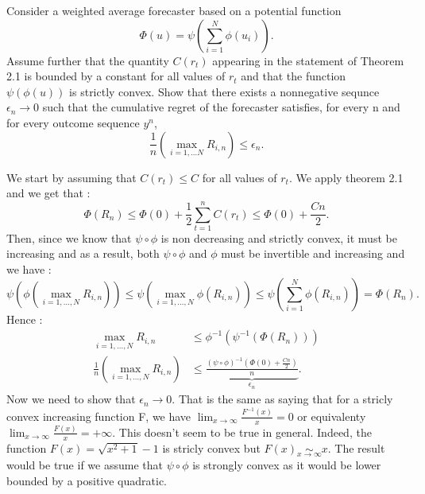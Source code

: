 \begin{exercise}[]{}
	Consider a weighted average forecaster based on a potential function
\begin{equation*}
	\Phi(u) = \psi \left( \sum_{i=1}^{N} \phi(u_i) \right).
\end{equation*}
Assume further that the quantity $ C(r_t) $ appearing in the statement of Theorem 2.1 is bounded by a constant for all values of $ r_t $ and that the function $ \psi(\phi(u)) $ is strictly convex. Show that there exists a nonnegative sequnce $ \epsilon_n \rightarrow 0 $ such that the cumulative regret of the forecaster satisfies, for every n and for every outcome sequence $ y^{n} $,
\begin{equation*}
	\frac{1}{n}\left( \max_{i=1, \ldots N}R_{i,n} \right) \leq \epsilon_n .
\end{equation*}

\end{exercise}

\begin{solution}[]
We start by assuming that $ C(r_t) \leq C $ for all values of $ r_t $. We apply theorem 2.1 and we get that :
\begin{equation*}
	\Phi(R_n) \leq \Phi(0) + \frac{1}{2}\sum_{t=1}^{n}C(r_t) \leq \Phi(0) + \frac{Cn}{2}.
\end{equation*}
Then, since we know that $ \psi\circ \phi $ is non decreasing and strictly convex, it must be increasing and as a result, both $ \psi \circ \phi $ and $ \phi $ must be invertible and increasing and we have : 
\begin{equation*}
	\psi \left( \phi \left( \max_{i=1,\ldots,N} R_{i,n} \right) \right) \leq \psi \left( \max_{i=1,\ldots,N} \phi(R_{i,n}) \right) \leq \psi\left(\sum_{i=1}^{N} \phi(R_{i,n})\right) = \Phi(R_n).
\end{equation*}
Hence :
\begin{align*}
	\max_{i=1,\ldots,N}R_{i,n} &\leq \phi^{-1}(\psi^{-1}(\Phi(R_n)))\\
	\frac{1}{n} \left( \max_{i=1,\ldots,N}R_{i,n} \right)				   &\leq \underbrace{\frac{(\psi\circ \phi)^{-1}\left(\Phi(0) + \frac{Cn}{2}\right)}{n}}_{\epsilon_n}.
\end{align*}
Now we need to show that $ \epsilon_n \rightarrow 0 $. That is the same as saying that for a stricly convex increasing function F, we have $ \lim_{x\rightarrow \infty}\frac{F^{-1}(x)}{x} = 0 $ or equivalenty $  \lim_{x\rightarrow \infty}\frac{F(x)}{x} = + \infty  $. This doesn't seem to be true in general. Indeed, the function $ F(x) = \sqrt{x^{2}+1}-1 $ is stricly convex but $ F(x) \underset{x\rightarrow \infty}{\sim} x $. The result would be true if we assume that $ \psi \circ \phi $ is strongly convex as it would be lower bounded by a positive quadratic.
\end{solution}
